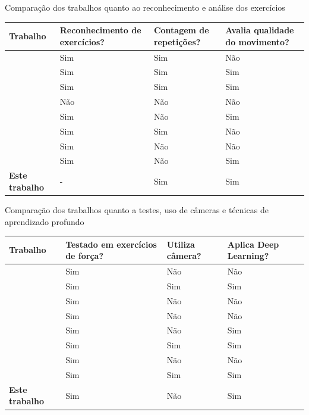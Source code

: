 \begin{quadro}[H]
\centering
\caption{Comparação dos trabalhos quanto ao reconhecimento e análise dos exercícios}
\label{tab:correlatos2}
\renewcommand{\arraystretch}{1.3}
\begin{tabular}{|l|C{2cm}|C{2cm}|C{2cm}|}
\hline
\textbf{Trabalho} & \textbf{Reconhecimento de exercícios?} & \textbf{Contagem de repetições?} & \textbf{Avalia qualidade do movimento?} \\
\hline
\cite{balkhi-multipurpose-nodate}            & Sim & Sim & Não \\\hline
\cite{chen-analysis-2024}       & Sim & Sim & Sim \\\hline
\cite{dzaja-quantitative-nodate}         & Sim & Sim & Sim \\\hline
\cite{emmanouil-two-2024}  & Não & Não & Não \\\hline
\cite{gupta-yogahelp-2021}    & Sim & Não & Sim \\\hline
\cite{hwang-estimation-2023}      & Sim & Sim & Não \\\hline
\cite{pinto-aplicacao-2023}             & Sim & Não & Não \\\hline
\cite{xia_volearn_2022}         & Sim & Não & Sim \\\hline
\textbf{Este trabalho}        & - & Sim & Sim \\
\hline
\end{tabular}
\end{quadro}

\begin{quadro}[H]
\centering
\caption{Comparação dos trabalhos quanto a testes, uso de câmeras e técnicas de aprendizado profundo}
\label{tab:correlatos3}
\renewcommand{\arraystretch}{1.3}
\begin{tabular}{|l|C{2cm}|C{2cm}|C{2cm}|}
\hline
\textbf{Trabalho} & \textbf{Testado em exercícios de força?} & \textbf{Utiliza câmera?} & \textbf{Aplica Deep Learning?} \\
\hline
\cite{balkhi-multipurpose-nodate}            & Sim & Não & Não \\\hline
\cite{chen-analysis-2024}       & Sim & Sim & Sim \\\hline
\cite{dzaja-quantitative-nodate}         & Sim & Não & Não \\\hline
\cite{emmanouil-two-2024}  & Sim & Não & Não \\\hline
\cite{gupta-yogahelp-2021}    & Sim & Não & Sim \\\hline
\cite{hwang-estimation-2023}      & Sim & Sim & Sim \\\hline
\cite{pinto-aplicacao-2023}             & Sim & Não & Não \\\hline
\cite{xia_volearn_2022}         & Sim & Sim & Sim \\\hline
\textbf{Este trabalho}        & Sim & Não & Sim \\
\hline
\end{tabular}
\end{quadro}

